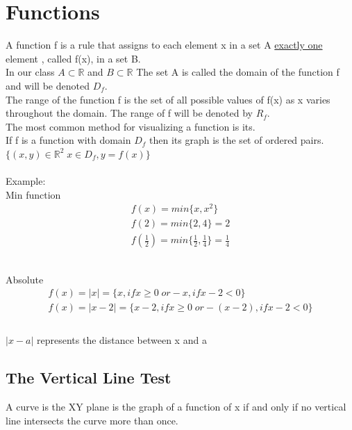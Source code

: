 \documentclass{article}
\begin{document}
\section{Functions}
A function f is a rule that assigns to each element x in a set A \underline{exactly one} element , called f(x), in a set B. \\
In our class $ A \subset \mathbb{R} $ and $ B \subset \mathbb{R}$
The set A is called the domain of the function f and will be denoted $D_f$.\\
The range of the function f is the set of all possible values of f(x) as x varies throughout the domain. The range of f will be denoted by $R_f$.\\
The most common method for visualizing a function is its.\\ 
If f is a function with domain $D_f$ then its graph is the set of ordered pairs. \\
$ \{(x, y) \in \mathbb{R}^2 \; x\in D_f, y=f(x) \}$ \\ \\
Example: \\ 
Min function  \\
\begin{equation}
	\begin{gathered}
		f(x) = min\{x, x^2\} \\
		f(2) = min\{2, 4\} = 2 \\
		f(\frac{1}{2}) = min\{\frac{1}{2}, \frac{1}{4}\} = \frac{1}{4} \\ \\ \\
	\end{gathered}
\end{equation}

Absolute \\
\begin{equation}
	\begin{gathered}
		f(x) = |x| = \{x, if x \geq 0 \; or -x, if x-2 < 0\}\\
		f(x) = |x -2| = \{x-2, if x \geq 0 \; or -(x-2), if x-2 < 0\} \\ \\
	\end{gathered}
\end{equation}

$|x-a|$ represents the distance between x and a
\subsection{The Vertical Line Test}
A curve is the XY plane is the graph of a function of x if and only if no vertical line intersects the curve more than once.
\end{document}
